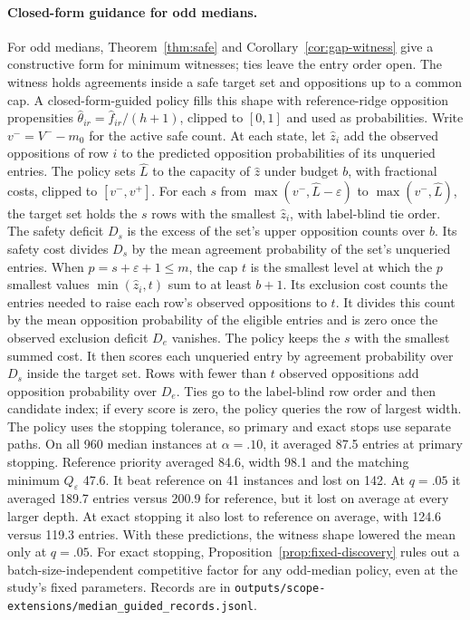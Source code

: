 \paragraph{Closed-form guidance for odd medians.}
\label{app:median-guided}
For odd medians, Theorem~\ref{thm:safe} and Corollary~\ref{cor:gap-witness} give a constructive form for minimum witnesses; ties leave the entry order open. The witness holds agreements inside a safe target set and oppositions up to a common cap. A closed-form-guided policy fills this shape with reference-ridge opposition propensities $\hat\theta_{ir}=\hat f_{ir}/(h+1)$, clipped to $[0,1]$ and used as probabilities. Write $v^-=V^--m_0$ for the active safe count. At each state, let $\hat z_i$ add the observed oppositions of row $i$ to the predicted opposition probabilities of its unqueried entries. The policy sets $\hat L$ to the capacity of $\hat z$ under budget $b$, with fractional costs, clipped to $[v^-,v^+]$. For each $s$ from $\max(v^-,\hat L-\varepsilon)$ to $\max(v^-,\hat L)$, the target set holds the $s$ rows with the smallest $\hat z_i$, with label-blind tie order. The safety deficit $D_s$ is the excess of the set's upper opposition counts over $b$. Its safety cost divides $D_s$ by the mean agreement probability of the set's unqueried entries. When $p=s+\varepsilon+1\le m$, the cap $t$ is the smallest level at which the $p$ smallest values $\min(\hat z_i,t)$ sum to at least $b+1$. Its exclusion cost counts the entries needed to raise each row's observed oppositions to $t$. It divides this count by the mean opposition probability of the eligible entries and is zero once the observed exclusion deficit $D_e$ vanishes. The policy keeps the $s$ with the smallest summed cost. It then scores each unqueried entry by agreement probability over $D_s$ inside the target set. Rows with fewer than $t$ observed oppositions add opposition probability over $D_e$. Ties go to the label-blind row order and then candidate index; if every score is zero, the policy queries the row of largest width. The policy uses the stopping tolerance, so primary and exact stops use separate paths. On all 960 median instances at $\alpha=.10$, it averaged 87.5 entries at primary stopping. Reference priority averaged 84.6, width 98.1 and the matching minimum $Q_\varepsilon$ 47.6. It beat reference on 41 instances and lost on 142. At $q=.05$ it averaged 189.7 entries versus 200.9 for reference, but it lost on average at every larger depth. At exact stopping it also lost to reference on average, with 124.6 versus 119.3 entries. With these predictions, the witness shape lowered the mean only at $q=.05$. For exact stopping, Proposition~\ref{prop:fixed-discovery} rules out a batch-size-independent competitive factor for any odd-median policy, even at the study's fixed parameters. Records are in \nolinkurl{outputs/scope-extensions/median_guided_records.jsonl}.
